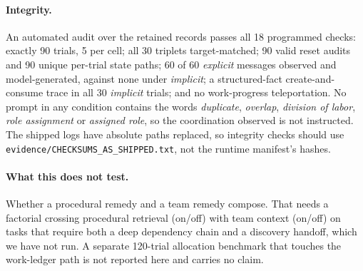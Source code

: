 \documentclass[letterpaper]{article} %
\begin{document}
\paragraph{Integrity.}  An automated audit over the retained records passes
all 18 programmed checks: exactly 90 trials, 5 per cell; all 30 triplets
target-matched; 90 valid reset audits and 90 unique per-trial state paths;
60 of 60 \emph{explicit} messages observed and model-generated, against none
under \emph{implicit}; a structured-fact create-and-consume trace in all 30
\emph{implicit} trials; and no work-progress teleportation.  No prompt in any
condition contains the words \emph{duplicate}, \emph{overlap},
\emph{division of labor}, \emph{role assignment} or \emph{assigned role}, so
the coordination observed is not instructed.  The shipped logs have absolute
paths replaced, so integrity checks should use
\texttt{evidence/\allowbreak CHECKSUMS\_AS\_SHIPPED.txt}, not the runtime
manifest's hashes.

\paragraph{What this does not test.}  Whether a procedural remedy and a team
remedy compose.  That needs a factorial crossing procedural retrieval (on/off)
with team context (on/off) on tasks that require both a deep dependency chain
and a discovery handoff, which we have not run.  A separate 120-trial
allocation benchmark that touches the work-ledger path is not reported here
and carries no claim.



\end{document}
